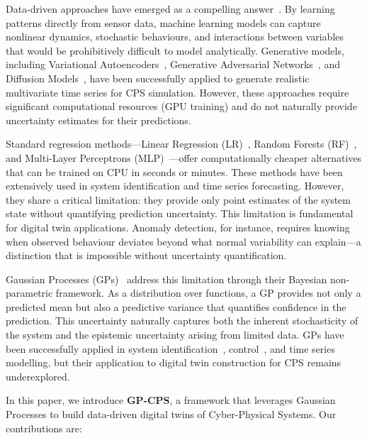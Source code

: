 \documentclass[conference]{IEEEtran}
\begin{document}
Data-driven approaches have emerged as a compelling answer~\cite{yuan2019}. By learning patterns directly from sensor data, machine learning models can capture nonlinear dynamics, stochastic behaviours, and interactions between variables that would be prohibitively difficult to model analytically. Generative models, including Variational Autoencoders~\cite{kingma2013}, Generative Adversarial Networks~\cite{goodfellow2014}, and Diffusion Models~\cite{ho2020}, have been successfully applied to generate realistic multivariate time series for CPS simulation. However, these approaches require significant computational resources (GPU training) and do not naturally provide uncertainty estimates for their predictions.

Standard regression methods---Linear Regression (LR)~\cite{ljung1999}, Random Forests (RF)~\cite{breiman2001}, and Multi-Layer Perceptrons (MLP)~\cite{hornik1989}---offer computationally cheaper alternatives that can be trained on CPU in seconds or minutes. These methods have been extensively used in system identification and time series forecasting. However, they share a critical limitation: they provide only point estimates of the system state without quantifying prediction uncertainty. This limitation is fundamental for digital twin applications. Anomaly detection, for instance, requires knowing when observed behaviour deviates beyond what normal variability can explain---a distinction that is impossible without uncertainty quantification.

Gaussian Processes (GPs)~\cite{rasmussen2006} address this limitation through their Bayesian non-parametric framework. As a distribution over functions, a GP provides not only a predicted mean but also a predictive variance that quantifies confidence in the prediction. This uncertainty naturally captures both the inherent stochasticity of the system and the epistemic uncertainty arising from limited data. GPs have been successfully applied in system identification~\cite{kocijan2004}, control~\cite{deisenroth2015}, and time series modelling, but their application to digital twin construction for CPS remains underexplored.

In this paper, we introduce \textbf{GP-CPS}, a framework that leverages Gaussian Processes to build data-driven digital twins of Cyber-Physical Systems. Our contributions are:
\end{document}
